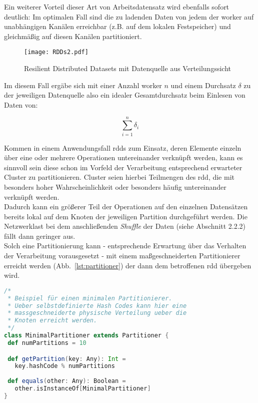 Ein weiterer Vorteil dieser Art von Arbeitsdatensatz wird ebenfalls sofort deutlich: Im optimalen Fall sind die zu ladenden Daten von jedem der \gls{worker} auf unabhängigen Kanälen erreichbar (z.B. auf dem lokalen Festspeicher) und gleichmäßig auf diesen Kanälen partitioniert.\\

\begin{figure}[h!]
	\centering
  \texttt{[image: RDDs2.pdf]}
	\caption{Resilient Distributed Datasets mit Datenquelle aus Verteilungssicht}
	\label{fig:rdds2}
\end{figure}

Im diesem Fall ergäbe sich mit einer Anzahl \gls{worker} $n$ und einem Durchsatz $\delta$ zu der jeweiligen Datenquelle also ein idealer Gesamtdurchsatz beim Einlesen von Daten von:

\begin{equation}
	\sum_{i=1}^{n} \delta_i
\end{equation}

Kommen in einem Anwendungsfall \gls{rdd}s zum Einsatz, deren Elemente einzeln über eine oder mehrere Operationen untereinander verknüpft werden, kann es sinnvoll sein diese schon im Vorfeld der Verarbeitung entsprechend erwarteter Cluster zu partitionieren. Cluster seien hierbei Teilmengen des \gls{rdd}, die mit besonders hoher Wahrscheinlichkeit oder besonders häufig untereinander verknüpft werden.\\

Dadurch kann ein größerer Teil der Operationen auf den einzelnen Datensätzen bereits lokal auf dem Knoten der jeweiligen Partition durchgeführt werden. Die Netzwerklast bei dem anschließenden \textit{Shuffle} der Daten (siehe Abschnitt 2.2.2) fällt dann geringer aus.\\

Solch eine Partitionierung kann - entsprechende Erwartung über das Verhalten der Verarbeitung vorausgesetzt - mit einem maßgeschneiderten Partitionierer erreicht werden (Abb.~\ref{lst:partitioner}) der dann dem betroffenen \gls{rdd} übergeben wird.\\

\begin{lstlisting}[language=Scala,caption={Beispiel: Minimaler Partitionierer},label={lst:partitioner}]
/*
 * Beispiel für einen minimalen Partitionierer. 
 * Ueber selbstdefinierte Hash Codes kann hier eine 
 * massgeschneiderte physische Verteilung ueber die 
 * Knoten erreicht werden.
 */
class MinimalPartitioner extends Partitioner {
 def numPartitions = 10

 def getPartition(key: Any): Int =
   key.hashCode % numPartitions
	
 def equals(other: Any): Boolean =
   other.isInstanceOf[MinimalPartitioner]
}
\end{lstlisting}

